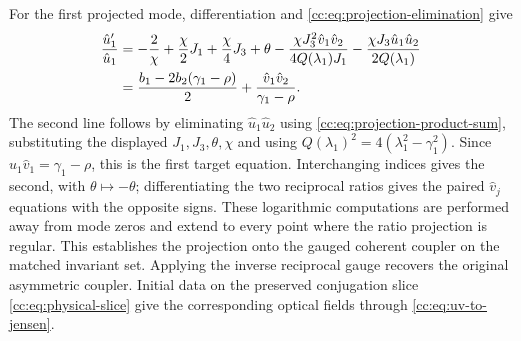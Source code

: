 \documentclass[11pt,a4paper]{article}
\begin{document}
For the first projected mode, differentiation and \eqref{cc:eq:projection-elimination} give
\begin{align}
\frac{\hat u_1'}{\hat u_1}
&=-\frac2\chi+\frac\chi2J_1+\frac\chi4J_3+\theta
-\frac{\chi J_3^2\hat v_1\hat v_2}{4Q(\lambda_1)J_1}
-\frac{\chi J_3\hat u_1\hat u_2}{2Q(\lambda_1)}\notag\\
&=\frac{b_1-2b_2(\gamma_1-\rho)}2
+\frac{\hat v_1\hat v_2}{\gamma_1-\rho}.
\end{align}
The second line follows by eliminating $\hat u_1\hat u_2$ using \eqref{cc:eq:projection-product-sum}, substituting the displayed $J_1,J_3,\theta,\chi$ and using
$Q(\lambda_1)^2=4(\lambda_1^2-\gamma_1^2)$.
Since $\hat u_1\hat v_1=\gamma_1-\rho$, this is the first target equation.
Interchanging indices gives the second, with $\theta\mapsto-\theta$; differentiating the two reciprocal ratios gives the paired $\hat v_j$ equations with the opposite signs.
These logarithmic computations are performed away from mode zeros and extend to every point where the ratio projection is regular.
This establishes the projection onto the gauged coherent coupler on the matched invariant set.
Applying the inverse reciprocal gauge recovers the original asymmetric coupler.
Initial data on the preserved conjugation slice \eqref{cc:eq:physical-slice} give the corresponding optical fields through \eqref{cc:eq:uv-to-jensen}.
\end{document}
